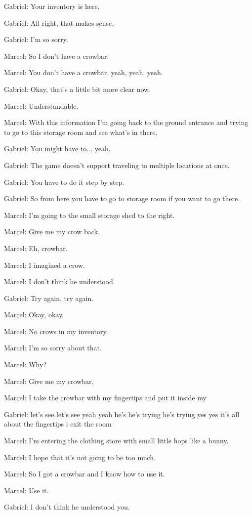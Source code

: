 Gabriel: Your inventory is here.

Gabriel: All right, that makes sense.

Gabriel: I'm so sorry.

Marcel: So I don't have a crowbar.

Marcel: You don't have a crowbar, yeah, yeah, yeah.

Gabriel: Okay, that's a little bit more clear now.

Marcel: Understandable.

Marcel: With this information I'm going back to the ground entrance and trying to go to this storage room and see what's in there.

Gabriel: You might have to... yeah.

Gabriel: The game doesn't support traveling to multiple locations at once.

Gabriel: You have to do it step by step.

Gabriel: So from here you have to go to storage room if you want to go there.

Marcel: I'm going to the small storage shed to the right.

Marcel: Give me my crow back.

Marcel: Eh, crowbar.

Marcel: I imagined a crow.

Marcel: I don't think he understood.

Gabriel: Try again, try again.

Marcel: Okay, okay.

Marcel: No crows in my inventory.

Marcel: I'm so sorry about that.

Marcel: Why?

Marcel: Give me my crowbar.

Marcel: I take the crowbar with my fingertips and put it inside my

Gabriel: let's see let's see yeah yeah he's he's trying he's trying yes yes it's all about the fingertips i exit the room

Marcel: I'm entering the clothing store with small little hops like a bunny.

Marcel: I hope that it's not going to be too much.

Marcel: So I got a crowbar and I know how to use it.

Marcel: Use it.

Gabriel: I don't think he understood you.

